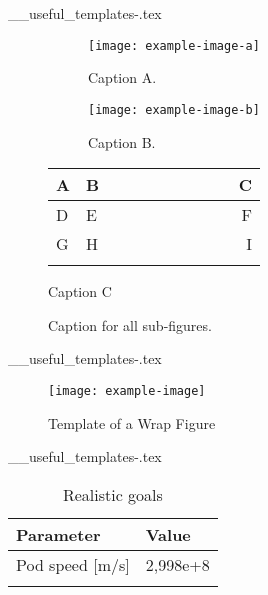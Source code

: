 \begin{filecontents*}{__useful_templates-\theusefultemplate.tex}
\begin{figure}[tph]
    \centering
    \begin{subfigure}{0.3\textwidth}
    \centering
    \texttt{[image: example-image-a]} %
    \caption{Caption A.} \label{subfig:subfig-example-a}
    \end{subfigure}
    \hfill
    \begin{subfigure}{0.3\textwidth}
    \centering
    \texttt{[image: example-image-b]}
    \caption{Caption B.} \label{subfig:subfig-example-b}
    \end{subfigure}
    \hfill 
    \begin{subtable}[b]{0.3\textwidth}
        \begin{tabular}{L{0.1\linewidth} C{0.4\linewidth} r}
        \hhline{===} 
        \textbf{A} & \textbf{B} & \textbf{C}   \\ \hline 
        D & E & F   \\
        G & H & I   \\
        \hhline{===}
        \end{tabular}
        \caption{Caption C} \label{table:table}
  \end{subtable}
  \caption{Caption for all sub-figures.} \label{fig:subfig-example}
\end{figure}
\end{filecontents*}

\begin{filecontents*}{__useful_templates-\theusefultemplate.tex}
\begin{wrapfigure}{r}{0.4\linewidth}
    \centering
    \texttt{[image: example-image]}
    \caption{Template of a Wrap Figure}
    \label{fig:descriptive-label}
\end{wrapfigure}

\lipsum[1]
\end{filecontents*}


\begin{filecontents*}{__useful_templates-\theusefultemplate.tex}
\begin{table}[h]
    \centering
    \begin{tabular}{ll}
        \hhline{==} %
        \textbf{Parameter} & \textbf{Value} \\
        \hline
        Pod speed [m/s] & 2,998e+8 \\
        \hhline{==}
    \end{tabular}

    \caption{Realistic goals}
    \label{table:table}
\end{table}
\end{filecontents*}

